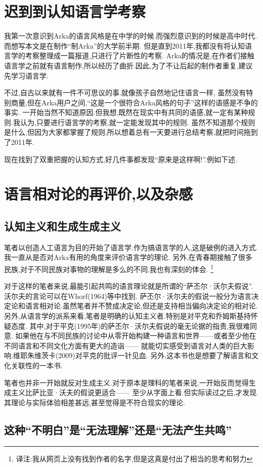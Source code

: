 \section{迟到到认知语言学考察}
我第一次意识到Arka的语言风格是在中学的时候.而强烈意识到的时候是高中时代.而想写本文是在制作``制Arka''的大学前半期.
但是直到2011年,我都没有将认知语言学的考察整理成一篇报道,只进行了片断性的考察.
Arka的情况是,在作者们接触语言学之前就有语言制作,所以经历了曲折.因此,为了不让后起的制作者重复,建议先学习语言学.

不过,自古以来就有一件不可思议的事.就像孩子自然地记住语言一样,
虽然没有特别商量,但在Arka用户之间,“这是一个很符合Arka风格的句子”这样的语感是不争的事实.
一开始当然不知道原因.但我想,既然在现实中有共同的语感,就一定有某种规则.我认为,只要进行语言学的考察,就一定能发现其中的规则.
虽然不知道那个规则是什么,但因为大家都掌握了规则,所以想着总有一天要进行总结考察,就把时间拖到了2011年.

现在找到了双重把握的认知方式,好几件事都发现“原来是这样啊!”.例如下述.
\section{语言相对论的再评价,以及杂感}
\subsection{认知主义和生成生成主义}
笔者以创造人工语言为目的开始了语言学.作为搞语言学的人,这是破例的进入方式.我一直从是否对Arka有用的角度来评价语言学的理论.
另外,在青春期接触了很多民族,对于不同民族对事物的理解是多么的不同,我也有深刻的体会.
\footnote{译注:我从网页上没有找到作者的名字,但是这真是付出了相当的思考和努力}

对于这样的笔者来说,最能引起共鸣的语言理论就是所谓的“萨丕尔·沃尔夫假说”.沃尔夫的言论可以在Whorf(1964)等中找到.
萨丕尔·沃尔夫的假说一般分为语言决定论和语言相对论.虽然笔者并不赞成决定论,但还是支持相当偏向决定论的相对论.
另外,从语言学的派系来看,笔者是明确的认知主义者.特别是对平克和乔姆斯基持怀疑态度.
其中,对于平克(1995年)的萨丕尔·沃尔夫假说的毫无论据的指责,我很难同意.
如果他在与不同民族的讨论中从零开始构建一种语言和世界------或者至少他在不同语言和不同文化方面有更大的造诣------
就能切实感受到语言对人类的巨大影响.维耶朱维茨卡(2009)对平克的批评一针见血.
另外,这本书也是想要了解语言和文化关联性的一本书.

笔者也并非一开始就反对生成主义.对于原本是理科的笔者来说,一开始反而觉得生成主义比萨比亚·沃夫的假说更适合——
至少从字面上看.但实际读过之后,才发现其理论与实际体验相差甚远,甚至觉得是不符合现实的理论.
\subsection{这种``不明白''是``无法理解''还是``无法产生共鸣''}

